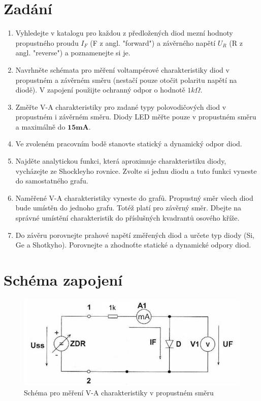 \documentclass[12pt]{article} %
\begin{document}
\section{Zadání}
\begin{enumerate}
\item Vyhledejte v katalogu pro každou z předložených diod mezní hodnoty
propustného proudu $I_F$ (F z angl. "forward") a závěrného napětí $U_R$ (R z
angl. "reverse") a poznamenejte si je.
\item Navrhněte schémata pro měření voltampérové charakteristiky diod
v propustném a závěrném směru (nestačí pouze otočit polaritu napětí na
diodě). V zapojení použijte ochranný odpor o hodnotě $1k\Omega$.
\item Změřte V-A charakteristiky pro zadané typy polovodičových diod v
propustném i závěrném směru. Diody LED měřte pouze v propustném směru
a maximálně do $\mathbf{15 mA}$.
\item Ve zvoleném pracovním bodě stanovte statický a dynamický odpor diod.
\item Najděte analytickou funkci, která aproximuje charakteristiku diody,
vycházejte ze Shockleyho rovnice. Zvolte si jednu diodu a tuto funkci vyneste
do samostatného grafu.
\item Naměřené V-A charakteristiky vyneste do grafů. Propustný směr všech diod
bude umístěn do jednoho grafu. Totéž platí pro závěrný směr. Dbejte na
správné umístění charakteristik do příslušných kvadrantů osového kříže.
\item Do závěru porovnejte prahové napětí změřených diod a určete typ diody (Si,
Ge a Shotkyho). Porovnejte a zhodnoťte statické a dynamické odpory diod.
\end{enumerate}

\section{Schéma zapojení}
\begin{figure}[H]
\includegraphics[scale=1]{propustny.jpg}
\caption{Schéma pro měření V-A charakteristiky v propustném směru}
\end{figure}
\end{document}
